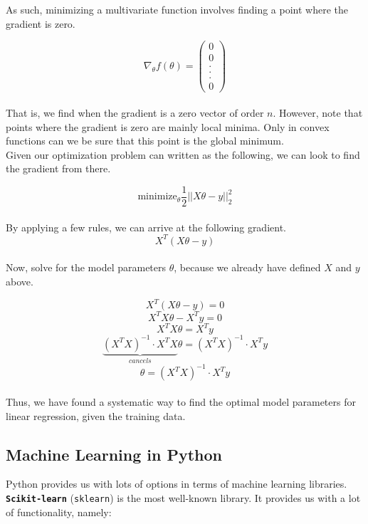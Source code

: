 \documentclass[english, 10pt]{article}
\begin{document}
As such, minimizing a multivariate function involves finding a point where the gradient is zero.

$$ \nabla_{\theta} f(\theta)=\begin{pmatrix}
0\\
0\\
.\\
.\\
.\\
0
\end{pmatrix}$$\\

That is, we find when the gradient is a zero vector of order $n$. However, note that points where the gradient is zero are mainly local minima. Only in convex functions can we be sure that this point is the global minimum.\\

Given our optimization problem can written as the following, we can look to find the gradient from there.                                                     

$$\mathrm{minimize}_{\theta} \frac{1}{2}||X \theta - y||_2^2$$\\


By applying a few rules, we can arrive at the following gradient.\\

$$X^T(X \theta -y)$$\\

Now, solve for the model parameters $\theta$, because we already have defined $X$ and $y$ above.

$$X^T(X \theta -y)=0$$
$$X^TX \theta - X^T y =0$$
$$X^TX \theta =X^T y$$
$$ \underbrace{ (X^T X)^{-1} \cdot X^TX}_{cancels}  \theta = (X^T X)^{-1} \cdot X^T y$$
$$\theta = (X^T X)^{-1} \cdot X^T y$$\\

Thus, we have found a systematic way to find the optimal model parameters for linear regression, given the training data.

\subsection{Machine Learning in Python}

Python provides us with lots of options in terms of machine learning libraries.\\

\textbf{\texttt{Scikit-learn}} (\texttt{sklearn}) is the most well-known library. It provides us with a lot of functionality, namely:
\end{document}

